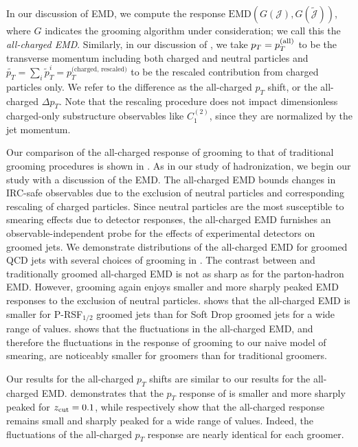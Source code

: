 In our discussion of EMD, we compute the response \(\text{EMD}\left(G(\mathcal{J}), G(\tilde{\mathcal{J}})\right)\), where \(G\) indicates the grooming algorithm under consideration;
%
we call this the \textit{all-charged EMD}.
%
Similarly, in our discussion of , we take \(p_T = p_T^{\rm(all)}\) to be the transverse momentum including both charged and neutral particles and \(\widetilde{p_T} = \sum_i \tilde p_T^i = p_T^{\text{(charged, rescaled)}}\) to be the rescaled contribution from charged particles only.
%
We refer to the difference as the all-charged \(p_T\) shift, or the all-charged \(\Delta p_T\).
%
Note that the rescaling procedure does not impact dimensionless charged-only substructure observables like \(C_1^{(2)}\), since they are normalized by the jet momentum.


Our comparison of the all-charged response of \PIRANHA{} grooming to that of traditional grooming procedures is shown in .
%
As in our study of hadronization, we begin our study with a discussion of the EMD.
%
The all-charged EMD bounds changes in IRC-safe observables due to the exclusion of neutral particles and corresponding rescaling of charged particles.
%
Since neutral particles are the most susceptible to smearing effects due to detector responses, the all-charged EMD furnishes an observable-independent probe for the effects of experimental detectors on groomed jets.
%
We demonstrate distributions of the all-charged EMD for groomed QCD jets with several choices of grooming in .
%
The contrast between \PIRANHA{} and traditionally groomed all-charged EMD is not as sharp as for the parton-hadron EMD.
%
However, \PIRANHA{} grooming again enjoys smaller and more sharply peaked EMD responses to the exclusion of neutral particles.
%
 shows that the all-charged EMD is smaller for P-RSF\(_{1/2}\) groomed jets than for Soft Drop groomed jets for a wide range of \zcut{} values.
%
 shows that the fluctuations in the all-charged EMD, and therefore the fluctuations in the response of grooming to our naive model of smearing, are noticeably smaller for \PIRANHA{} groomers than for traditional groomers.

Our results for the all-charged \(p_T\) shifts are similar to our results for the all-charged EMD.
%
 demonstrates that the \(p_T\) response of  is smaller and more sharply peaked for $z_{\rm cut} = 0.1$, while  respectively show that the  all-charged response remains small and sharply peaked for a wide range of \zcut{} values.
%
Indeed, the fluctuations of the all-charged \(p_T\) response are nearly identical for each \PIRANHA{} groomer.

